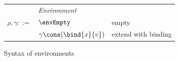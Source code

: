 \begin{figure}
   \small
   \begin{minipage}[t]{0.48\textwidth}
      \begin{tabularx}{\textwidth}{rL{2.7cm}L{3cm}}
        &\textit{Environment} &
        \\
        $\rho, \gamma ::= $
        & $\envEmpty$
        & empty \\
        & $\gamma \cons (\bind{x}{v})$
        & extend with binding
      \end{tabularx}
   \end{minipage}
   \caption{Syntax of environments}
\label{fig:environments}
\end{figure}
